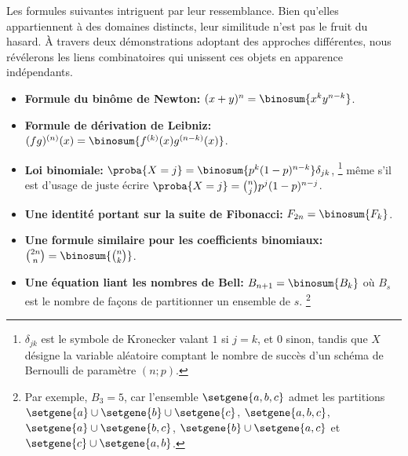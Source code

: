 Les formules suivantes intriguent par leur ressemblance. Bien qu'elles appartiennent à des domaines distincts, leur similitude n’est pas le fruit du hasard. À travers deux démonstrations adoptant des approches différentes, nous révélerons les liens combinatoires qui unissent ces objets en apparence indépendants.
%
\begin{itemize}
    \item \textbf{Formule du binôme de Newton:}
    $(x + y)^n = \binosum{x^k y^{n-k}}$.


    \item \textbf{Formule de dérivation de Leibniz:}
    $(fg)^{(n)}(x) = \binosum{f^{(k)}(x) g^{(n-k)}(x)}$.


    \item \textbf{Loi binomiale:}
    $\proba{X = j} = \binosum{p^k (1 - p)^{n-k}} \delta_{jk}$,%
    \footnote{
    	$\delta_{jk}$ est le symbole de Kronecker valant $1$ si $j=k$, et $0$ sinon,
		tandis que
		$X$ désigne la variable aléatoire comptant le nombre de succès d'un schéma de Bernoulli de paramètre $(n ; p)$.
    }
    même s'il est d'usage de juste écrire
    $\proba{X = j} =\binom{n}{j} p^j (1 - p)^{n-j}$.


    \item \textbf{Une identité portant sur la suite de Fibonacci:}
    $F_{2n} = \binosum{F_k}$.


    \item \textbf{Une formule similaire pour les coefficients binomiaux:}
    $\binom{2n}{n} = \binosum{\binom{n}{k}}$.


    \item \textbf{Une équation liant les nombres de Bell:}
    $B_{n+1} = \binosum{B_k}$ où $B_s$ est le nombre de façons de partitionner un ensemble de $s$.%
    \footnote{
    	Par exemple,
    	$B_3 = 5$,
    	car l'ensemble $\setgene{ a , b , c }$ admet les partitions
    	$\setgene{ a } \cup \setgene{ b } \cup \setgene{ c }$,
    	$\setgene{ a , b , c }$,
    	$\setgene{ a } \cup \setgene{ b , c }$,
    	$\setgene{ b } \cup \setgene{ a , c }$ et
    	$\setgene{ c } \cup \setgene{ a , b }$.
	}
\end{itemize}